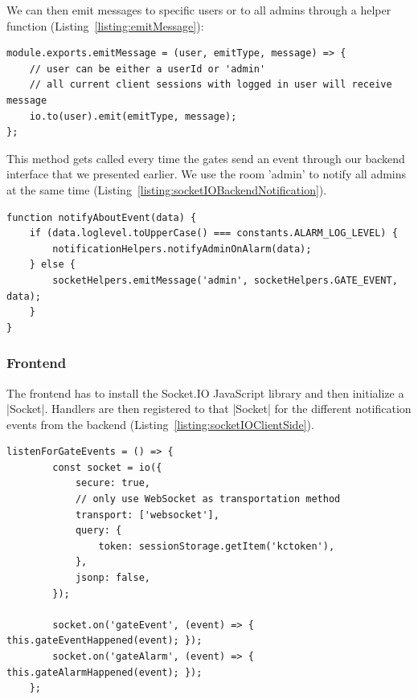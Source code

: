 We can then emit messages to specific users or to all admins through a helper function (Listing~\ref{listing:emitMessage}):
\begin{lstlisting}[label={listing:emitMessage},caption={Helper function for emitting notifications}]
module.exports.emitMessage = (user, emitType, message) => {
    // user can be either a userId or 'admin'
    // all current client sessions with logged in user will receive message
    io.to(user).emit(emitType, message);
};
\end{lstlisting}

This method gets called every time the gates send an event through our backend interface that we presented earlier. We use the room 'admin' to notify all admins at the same time (Listing~\ref{listing:socketIOBackendNotification}).

\begin{lstlisting}[label={listing:socketIOBackendNotification},caption={Emission of notification to all admins}]
function notifyAboutEvent(data) {
    if (data.loglevel.toUpperCase() === constants.ALARM_LOG_LEVEL) {
        notificationHelpers.notifyAdminOnAlarm(data);
    } else {
        socketHelpers.emitMessage('admin', socketHelpers.GATE_EVENT, data);
    }
}
\end{lstlisting}

\subsubsection{Frontend}
\label{Frontend}

The frontend has to install the Socket.IO JavaScript library and then initialize a |Socket|\cite{socketio:socket}. Handlers are then registered to that |Socket| for the different notification events from the backend (Listing~\ref{listing:socketIOClientSide}).

\begin{lstlisting}[label={listing:socketIOClientSide},caption={Setup of Socket.IO socket}]
listenForGateEvents = () => {
        const socket = io({
            secure: true,
            // only use WebSocket as transportation method
            transport: ['websocket'],
            query: {
                token: sessionStorage.getItem('kctoken'),
            },
            jsonp: false,
        });

        socket.on('gateEvent', (event) => { this.gateEventHappened(event); });
        socket.on('gateAlarm', (event) => { this.gateAlarmHappened(event); });
    };
\end{lstlisting}


